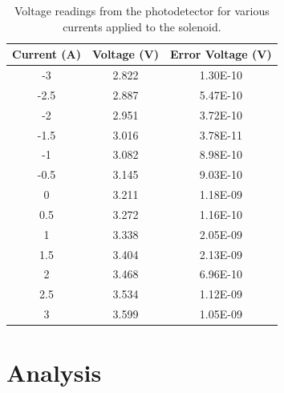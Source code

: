 \documentclass[prb,preprint]{revtex4-1}
\begin{document}
\begin{table}[h!]
\centering
\caption{Voltage readings from the photodetector for various currents applied to the solenoid. }
\begin{ruledtabular}
\begin{tabular}{c c c}
Current (A) & Voltage (V) & Error Voltage (V)\\
\hline	%
-3   & 2.822 & 1.30E-10 \\
-2.5 & 2.887 & 5.47E-10 \\
-2   & 2.951 & 3.72E-10 \\
-1.5 & 3.016 & 3.78E-11 \\
-1   & 3.082 & 8.98E-10 \\
-0.5 & 3.145 & 9.03E-10 \\
0    & 3.211 & 1.18E-09 \\
0.5  & 3.272 & 1.16E-10 \\
1    & 3.338 & 2.05E-09 \\
1.5  & 3.404 & 2.13E-09 \\
2    & 3.468 & 6.96E-10 \\
2.5  & 3.534 & 1.12E-09 \\
3    & 3.599 & 1.05E-09
\end{tabular}
\end{ruledtabular}
\label{V_I_Table}
\end{table}

\section{Analysis}

\end{document}
